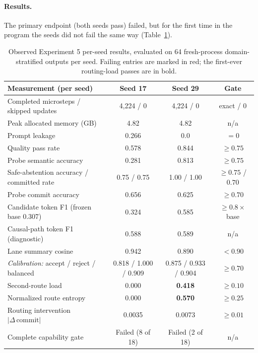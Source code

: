 \documentclass[10pt,a4paper]{article}
\newcommand{\fail}[1]{\textcolor{failred}{#1}}
\begin{document}
\paragraph{Results.}
The primary endpoint (both seeds pass) failed, but for the first time in
the program the seeds did not fail the same way
(Table~\ref{tab:study5}).

\begin{table}[htbp]
\caption{Observed Experiment 5 per-seed results, evaluated on 64 fresh-process
domain-stratified outputs per seed. Failing entries are marked in red; the
first-ever routing-load passes are in bold.}
\label{tab:study5}
\centering\small
\begin{tabularx}{\textwidth}{@{}Xccc@{}}
\toprule
\textbf{Measurement (per seed)} & \textbf{Seed 17} & \textbf{Seed 29} & \textbf{Gate} \\
\midrule
Completed microsteps / skipped updates & 4{,}224 / 0 & 4{,}224 / 0 & exact / 0 \\
Peak allocated memory (GB) & 4.82 & 4.82 & n/a \\
Prompt leakage & \fail{0.266} & 0.0 & $= 0$ \\
Quality pass rate & \fail{0.578} & 0.844 & $\ge 0.75$ \\
Probe semantic accuracy & \fail{0.281} & 0.813 & $\ge 0.75$ \\
Safe-abstention accuracy / committed rate & 0.75 / 0.75 & 1.00 / 1.00 & $\ge 0.75$ / $0.70$ \\
Probe commit accuracy & \fail{0.656} & \fail{0.625} & $\ge 0.70$ \\
Candidate token F1 (frozen base 0.307) & 0.324 & 0.585 & $\ge 0.8\times$ base \\
Causal-path token F1 (diagnostic) & 0.588 & 0.589 & n/a \\
Lane summary cosine & \fail{0.942} & 0.890 & $< 0.90$ \\
\emph{Calibration:} accept / reject / balanced & 0.818 / 1.000 / 0.909 & 0.875 / 0.933 / 0.904 & $\ge 0.70$ \\
Second-route load & \fail{0.000} & \textbf{0.418} & $\ge 0.10$ \\
Normalized route entropy & \fail{0.000} & \textbf{0.570} & $\ge 0.25$ \\
Routing intervention $|\Delta\,\mathrm{commit}|$ & \fail{0.0035} & \fail{0.0073} & $\ge 0.01$ \\
Complete capability gate & \fail{Failed (8 of 18)} & \fail{Failed (2 of 18)} & n/a \\
\bottomrule
\end{tabularx}
\end{table}
\end{document}
